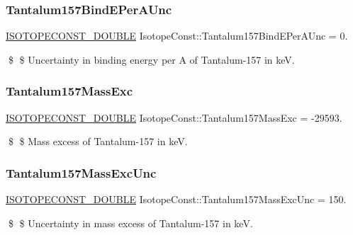 \subsubsection{\texorpdfstring{Tantalum157\+Bind\+E\+Per\+A\+Unc}{Tantalum157BindEPerAUnc}}
{\footnotesize\ttfamily \mbox{\hyperlink{group___isotope_const-_macros_ga8f45a7272ce02c0b4c65c44636ed719a}{I\+S\+O\+T\+O\+P\+E\+C\+O\+N\+S\+T\+\_\+\+D\+O\+U\+B\+LE}} Isotope\+Const\+::\+Tantalum157\+Bind\+E\+Per\+A\+Unc = 0.}

\$ \$ Uncertainty in binding energy per A of Tantalum-\/157 in keV. \mbox{\label{group___isotope_const-_tantalum-_ta157_ga4d6650f8ad106c3f6a9fb89d5080a9bf}} 
\subsubsection{\texorpdfstring{Tantalum157\+Mass\+Exc}{Tantalum157MassExc}}
{\footnotesize\ttfamily \mbox{\hyperlink{group___isotope_const-_macros_ga8f45a7272ce02c0b4c65c44636ed719a}{I\+S\+O\+T\+O\+P\+E\+C\+O\+N\+S\+T\+\_\+\+D\+O\+U\+B\+LE}} Isotope\+Const\+::\+Tantalum157\+Mass\+Exc = -\/29593.}

\$ \$ Mass excess of Tantalum-\/157 in keV. \mbox{\label{group___isotope_const-_tantalum-_ta157_ga2dd4928fb6498b1eb1e2e7cb0c022025}} 
\subsubsection{\texorpdfstring{Tantalum157\+Mass\+Exc\+Unc}{Tantalum157MassExcUnc}}
{\footnotesize\ttfamily \mbox{\hyperlink{group___isotope_const-_macros_ga8f45a7272ce02c0b4c65c44636ed719a}{I\+S\+O\+T\+O\+P\+E\+C\+O\+N\+S\+T\+\_\+\+D\+O\+U\+B\+LE}} Isotope\+Const\+::\+Tantalum157\+Mass\+Exc\+Unc = 150.}

\$ \$ Uncertainty in mass excess of Tantalum-\/157 in keV. \mbox{\label{group___isotope_const-_tantalum-_ta157_ga85cde2cde4f9eecd3096a3ca2d758721}} 
